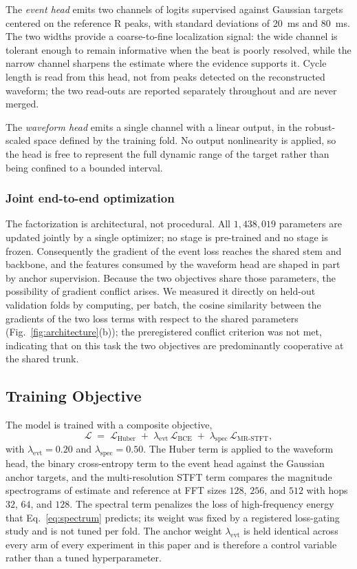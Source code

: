 \documentclass[lettersize,journal]{IEEEtran}
\begin{document}
The \emph{event head} emits two channels of logits supervised against Gaussian targets centered on the reference R peaks, with standard deviations of \SI{20}{\milli\second} and \SI{80}{\milli\second}. The two widths provide a coarse-to-fine localization signal: the wide channel is tolerant enough to remain informative when the beat is poorly resolved, while the narrow channel sharpens the estimate where the evidence supports it. Cycle length is read from this head, not from peaks detected on the reconstructed waveform; the two read-outs are reported separately throughout and are never merged.

The \emph{waveform head} emits a single channel with a linear output, in the robust-scaled space defined by the training fold. No output nonlinearity is applied, so the head is free to represent the full dynamic range of the target rather than being confined to a bounded interval.

\subsubsection*{Joint end-to-end optimization}
The factorization is architectural, not procedural. All $1{,}438{,}019$ parameters are updated jointly by a single optimizer; no stage is pre-trained and no stage is frozen. Consequently the gradient of the event loss reaches the shared stem and backbone, and the features consumed by the waveform head are shaped in part by anchor supervision. Because the two objectives share those parameters, the possibility of gradient conflict arises. We measured it directly on held-out validation folds by computing, per batch, the cosine similarity between the gradients of the two loss terms with respect to the shared parameters (Fig.~\ref{fig:architecture}(b)); the preregistered conflict criterion was not met, indicating that on this task the two objectives are predominantly cooperative at the shared trunk.

\subsection{Training Objective}
The model is trained with a composite objective,
\begin{equation}
  \mathcal{L} \;=\; \mathcal{L}_{\text{Huber}} \;+\; \lambda_{\text{evt}} \, \mathcal{L}_{\text{BCE}} \;+\; \lambda_{\text{spec}} \, \mathcal{L}_{\text{MR-STFT}},
  \label{eq:loss}
\end{equation}
with $\lambda_{\text{evt}} = 0.20$ and $\lambda_{\text{spec}} = 0.50$. The Huber term is applied to the waveform head, the binary cross-entropy term to the event head against the Gaussian anchor targets, and the multi-resolution STFT term compares the magnitude spectrograms of estimate and reference at FFT sizes $128$, $256$, and $512$ with hops $32$, $64$, and $128$. The spectral term penalizes the loss of high-frequency energy that Eq.~\eqref{eq:spectrum} predicts; its weight was fixed by a registered loss-gating study and is not tuned per fold. The anchor weight $\lambda_{\text{evt}}$ is held identical across every arm of every experiment in this paper and is therefore a control variable rather than a tuned hyperparameter.
\end{document}
